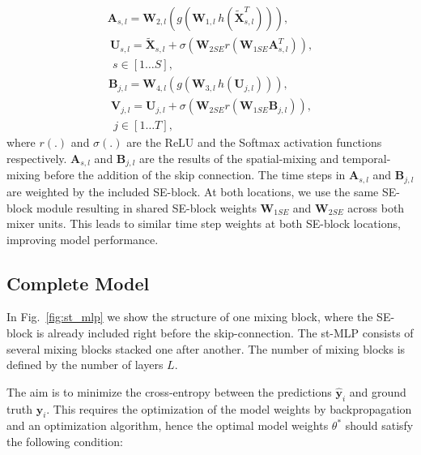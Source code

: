 \documentclass[letterpaper, 10 pt, conference]{ieeeconf}
\begin{document}
\begin{equation}
\begin{gathered}
    \textbf{A}_{s,l} = \textbf{W}_{2,l}(g(\textbf{W}_{1,l}\, h(\mathbf{\tilde{X}}^T_{s,l}))), \\\
    \textbf{U}_{s,l} = \mathbf{\tilde{X}}_{s,l} + \sigma(\textbf{W}_{2SE} r(\textbf{W}_{1SE}\textbf{A}_{s,l}^T)), \\\
    \: s\in [1\dots S],
\end{gathered}
\end{equation}
\begin{equation}
\begin{gathered}
    \textbf{B}_{j,l} = \textbf{W}_{4,l}(g(\textbf{W}_{3,l}\, h(\mathbf{U}_{j,l}))), \\\
    \textbf{V}_{j,l} =  \textbf{U}_{j,l} + \sigma(\textbf{W}_{2SE} r(\textbf{W}_{1SE}\textbf{B}_{j,l})), \\\
    \: j\in [1\dots T],
\end{gathered}
\end{equation}
where $r(.)$ and $\sigma(.)$ are the ReLU and the Softmax activation functions respectively. $\mathbf{A}_{s,l}$ and $\mathbf{B}_{j,l}$ are the results of the spatial-mixing and temporal-mixing before the addition of the skip connection. The time steps in $\mathbf{A}_{s,l}$ and $\mathbf{B}_{j,l}$ are weighted by the included SE-block. At both locations, we use the same SE-block module resulting in shared SE-block weights $\mathbf{W}_{1SE}$ and $\mathbf{W}_{2SE}$ across both mixer units. This leads to similar time step weights at both SE-block locations, improving model performance.


\subsection{Complete Model}

In Fig.~\ref{fig:st_mlp} we show the structure of one mixing block, where the SE-block is already included right before the skip-connection. The st-MLP consists of several mixing blocks stacked one after another. The number of mixing blocks is defined by the number of layers $L$.

The aim is to minimize the cross-entropy between the predictions $\mathbf{\hat{y}}_{i}$ and ground truth $\mathbf{y}_{i}$. This requires the optimization of the model weights by backpropagation and an optimization algorithm, hence the optimal model weights $\theta^{*}$ should satisfy the following condition:
\end{document}
